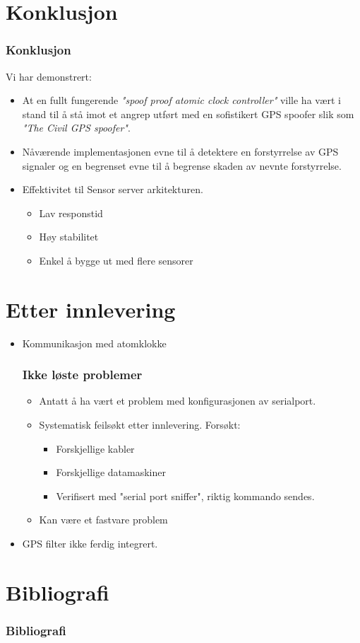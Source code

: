 \documentclass[xcolor=table]{beamer}
\begin{document}
\section{Konklusjon}
\begin{frame}
  \frametitle{Konklusjon}
  Vi har demonstrert:
  \begin{itemize}
    \item At en fullt fungerende \textit{"spoof proof atomic clock controller"} ville ha vært i stand til å stå imot et angrep utført med en sofistikert GPS spoofer slik som \textit{"The Civil GPS spoofer"}.
    \item Nåværende implementasjonen evne til å detektere en forstyrrelse av GPS signaler og en begrenset evne til å begrense skaden av nevnte forstyrrelse.
    \item Effektivitet til Sensor server arkitekturen. 
    \begin{itemize}
      \item Lav responstid
      \item Høy stabilitet 
      \item Enkel å bygge ut med flere sensorer
    \end{itemize}
  \end{itemize}
\end{frame}

\section{Etter innlevering}
\begin{frame}
  \begin{itemize}
  \item Kommunikasjon med atomklokke
    \frametitle{Ikke løste problemer}
    \begin{itemize}
      \item Antatt å ha vært et problem med konfigurasjonen av serialport.
      \item Systematisk feilsøkt etter innlevering. Forsøkt:
      \begin{itemize}
        \item Forskjellige kabler
        \item Forskjellige datamaskiner
        \item Verifisert med "serial port sniffer", riktig kommando sendes.
      \end{itemize}
      \item Kan være et fastvare problem
    \end{itemize}
  \item GPS filter ikke ferdig integrert.
  \end{itemize}
\end{frame}

\section{Bibliografi}
\begin{frame}[allowframebreaks]%
  \frametitle{Bibliografi}
  \printbibliography[heading=bibintoc]
\end{frame}
\end{document}
